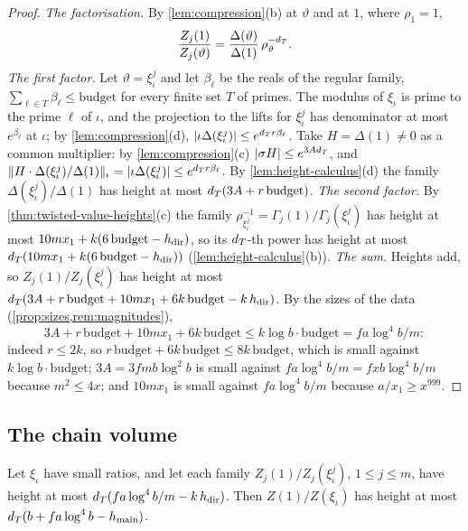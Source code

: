 \begin{proof}
\emph{The factorisation.} By \cref{lem:compression}(b) at $\vartheta$ and at $1$, where $\rho_1=1$,
\[
  \frac{Z_j(1)}{Z_j(\vartheta)}=\frac{\Delta(\vartheta)}{\Delta(1)}\,\rho_\vartheta^{-d_T}.
\]
\emph{The first factor.} Let $\vartheta=\xi^j_\iota$ and let $\beta_\ell$ be the reals of the regular family, $\sum_{\ell\in T}\beta_\ell\le\mathrm{budget}$ for every finite set $T$ of primes. The modulus of $\xi_\iota$ is prime to the prime $\ell$ of $\iota$, and
the projection to the lifts for $\xi^j_\iota$ has denominator at most $e^{\beta_\ell}$ at $\iota$; by \cref{lem:compression}(d), $\lvert \iota\Delta(\xi^j_\iota)\rvert\le e^{d_T r\beta_\ell}$. Take $H=\Delta(1)\ne0$ as a common multiplier: by \cref{lem:compression}(c)
$\lvert \sigma H\rvert\le e^{3Ad_T}$, and $\lVert H\cdot\Delta(\xi^j_\iota)/\Delta(1)\rVert_\iota=\lvert \iota\Delta(\xi^j_\iota)\rvert\le e^{d_T r\beta_\ell}$. By \cref{lem:height-calculus}(d) the family $\Delta(\xi^j_\iota)/\Delta(1)$ has height at most $d_T(3A+r\,\mathrm{budget})$.
\emph{The second factor.} By \cref{thm:twisted-value-heights}(c) the family $\rho_{\xi^j_\iota}^{-1}=\Gamma_j(1)/\Gamma_j(\xi^j_\iota)$ has height at most $10mx_1+k(6\,\mathrm{budget}-h_{\mathrm{dir}})$, so its $d_T$-th power has height at most $d_T(10mx_1+k(6\,\mathrm{budget}-h_{\mathrm{dir}}))$
(\cref{lem:height-calculus}(b)).
\emph{The sum.} Heights add, so $Z_j(1)/Z_j(\xi^j_\iota)$ has height at most $d_T(3A+r\,\mathrm{budget}+10mx_1+6k\,\mathrm{budget}-k\,h_{\mathrm{dir}})$. By the sizes of the data (\cref{prop:sizes,rem:magnitudes}),
\[
  3A+r\,\mathrm{budget}+10mx_1+6k\,\mathrm{budget}\le k\log b\cdot\mathrm{budget}=fa\log^4b/m:
\]
indeed $r\le2k$, so $r\,\mathrm{budget}+6k\,\mathrm{budget}\le8k\,\mathrm{budget}$, which is small against $k\log b\cdot\mathrm{budget}$; $3A=3fmb\log^2b$ is small against $fa\log^4b/m=fxb\log^4b/m$ because $m^2\le4x$; and $10mx_1$ is small against
$fa\log^4b/m$ because $a/x_1\ge x^{999}$.
\end{proof}

\subsection{The chain volume}\label{ss:chain-volume}

\begin{proposition}\label{prop:inverse-ratio}
Let $\xi_\iota$ have small ratios, and let each family $Z_j(1)/Z_j(\xi^j_\iota)$, $1\le j\le m$, have height at most $d_T(fa\log^4b/m-k\,h_{\mathrm{dir}})$. Then $Z(1)/Z(\xi_\iota)$ has height at most
$d_T(b+fa\log^4b-h_{\mathrm{main}})$.
\end{proposition}

